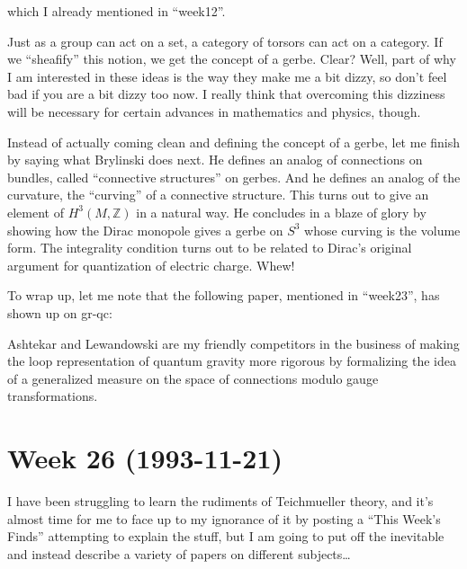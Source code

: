 \documentclass{article}
\def\tightlist{}
\renewcommand{\texttt}[1]{%
  \begingroup
  \ttfamily
  \begingroup\lccode`~=`/\lowercase{\endgroup\def~}{/\discretionary{}{}{}}%
  \begingroup\lccode`~=`[\lowercase{\endgroup\def~}{[\discretionary{}{}{}}%
  \begingroup\lccode`~=`.\lowercase{\endgroup\def~}{.\discretionary{}{}{}}%
  \catcode`/=\active\catcode`[=\active\catcode`.=\active
  \scantokens{#1\noexpand}%
  \endgroup
}
\begin{document}
which I already mentioned in ``week12''.

Just as a group can act on a set, a category of torsors can act on a
category. If we ``sheafify'' this notion, we get the concept of a gerbe.
Clear? Well, part of why I am interested in these ideas is the way they
make me a bit dizzy, so don't feel bad if you are a bit dizzy too now. I
really think that overcoming this dizziness will be necessary for
certain advances in mathematics and physics, though.

Instead of actually coming clean and defining the concept of a gerbe,
let me finish by saying what Brylinski does next. He defines an analog
of connections on bundles, called ``connective structures'' on gerbes.
And he defines an analog of the curvature, the ``curving'' of a
connective structure. This turns out to give an element of
\(H^3(M,\mathbb{Z})\) in a natural way. He concludes in a blaze of glory
by showing how the Dirac monopole gives a gerbe on \(S^3\) whose curving
is the volume form. The integrality condition turns out to be related to
Dirac's original argument for quantization of electric charge. Whew!

To wrap up, let me note that the following paper, mentioned in
``week23'', has shown up on gr-qc:


Ashtekar and Lewandowski are my friendly competitors in the business of
making the loop representation of quantum gravity more rigorous by
formalizing the idea of a generalized measure on the space of
connections modulo gauge transformations.
\hypertarget{week-26-1993-11-21}{%
\section{Week 26 (1993-11-21)}\label{week-26-1993-11-21}}

I have been struggling to learn the rudiments of Teichmueller theory,
and it's almost time for me to face up to my ignorance of it by posting
a ``This Week's Finds'' attempting to explain the stuff, but I am going
to put off the inevitable and instead describe a variety of papers on
different subjects\ldots{}
\end{document}
